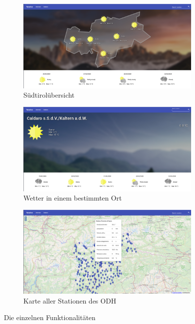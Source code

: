 \documentclass[a4paper,12pt]{article}
\begin{document}
\begin{figure}[H]
    \centering
    \begin{subfigure}[b]{0.9\linewidth}
        \includegraphics[width=\linewidth]{assets/complete-overview.png}
        \caption{Südtirolübersicht}
        \label{fig:complete-overview}
    \end{subfigure}
    \begin{subfigure}[b]{0.45\linewidth}
        \includegraphics[width=\linewidth]{assets/complete-location.png}
        \caption{Wetter in einem bestimmten Ort}
        \label{fig:complete-location}
    \end{subfigure}
    \begin{subfigure}[b]{0.45\linewidth}
        \includegraphics[width=\linewidth]{assets/complete-stations.png}
        \caption{Karte aller Stationen des ODH}
        \label{fig:complete-stations}
    \end{subfigure}
    \caption{Die einzelnen Funktionalitäten}
    \label{fig:complete}
\end{figure}
\end{document}
